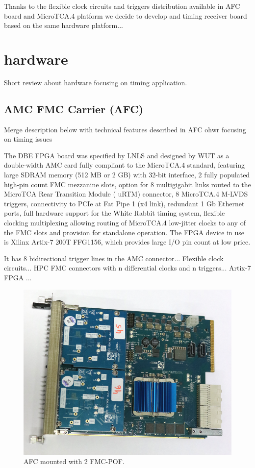 \documentclass[a4paper,
               biblatex,      %
               ]{jacow}
\begin{document}
Thanks to the flexible clock circuits and triggers distribution available in AFC board and MicroTCA.4 platform we decide to develop and timing receiver board based on the same hardware platform... 

\section{hardware}
Short review about hardware focusing on timing application.

\subsection{AMC FMC Carrier (AFC)}

Merge description below with technical features described in AFC ohwr focusing on timing issues

The  DBE  FPGA  board  was  specified  by  LNLS  and  designed  by  WUT  as  a  double-width  AMC  card  fully  compliant  to  the  MicroTCA.4  standard,  featuring  large  SDRAM   memory   (512   MB   or   2   GB)   with   32-bit   interface,    2    fully    populated    high-pin    count    FMC    mezzanine slots, option for 8 multigigabit links routed to the    MicroTCA    Rear    Transition    Module    (
uRTM) connector, 8 MicroTCA.4 M-LVDS triggers, connectivity to  PCIe  at  Fat  Pipe  1  (x4  link),  redundant  1  Gb  Ethernet  ports,  full  hardware  support  for  the  White  Rabbit  timing  system, flexible clocking multiplexing allowing routing of 
MicroTCA.4  low-jitter  clocks  to  any  of  the  FMC  slots  and provision for standalone operation. The FPGA device in  use  is  Xilinx  Artix-7  200T  FFG1156,  which  provides  large I/O pin count at low price. 

It has 8 bidirectional trigger lines in the AMC connector... Flexible clock circuits... HPC FMC connectors with n differential clocks and n triggers... Artix-7 FPGA ...

\begin{figure}[!htb]
   \centering
   \includegraphics*[width=0.8\columnwidth]{AFC_POFs_resized}
   \caption{AFC mounted with 2 FMC-POF.}
   \label{fig:afc_pofs}
\end{figure}
\end{document}
